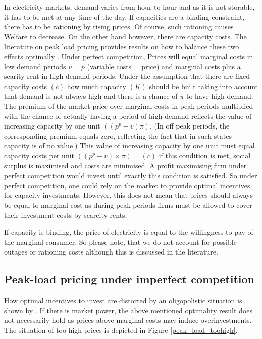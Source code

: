 In electricity markets, demand varies from hour to hour and as it is not storable, it has to be met at any time of the day. If capacities are a binding constraint, there has to be rationing by rising prices. Of course, such rationing causes Welfare to decrease. On the other hand however, there are capacity costs. The literature on peak load pricing provides results on how to balance these two effects optimally \cite{Crew1986}. Under perfect competition, Prices will equal marginal costs in low demand periods $v=p$ (variable costs = price) and marginal costs plus a scarity rent in high demand periods. Under the assumption that there are fixed capacity costs $(c)$ how much capacity $(K)$ should be built taking into account that demand is not always high and there is a chance of $\pi$ to have high demand. The premium of the market price over marginal costs in peak periods multiplied with the chance of actually having a period of high demand reflects the value of increasing capacity by one unit $((p^p-v)\pi)$. (In off peak periods, the corresponding premium equals zero, reflecting the fact that in such states capacity is of no value.) This value of increasing capacity by one unit must equal capacity costs per unit $((p^p-v)\times\pi)=(c)$ if this condition is met, social surplus is maximised and costs are minimised. A profit maximising firm under perfect competition would invest until exactly this condition is satisfied. So under perfect competition, one could rely on the market to provide optimal incentives for capacity investments. However, this does not mean that prices should always be equal to marginal cost as during peak periods firms must be allowed to cover their investment costs by scarcity rents.

If capacity is binding, the price of electricity is equal to the willingness to pay of the marginal consumer. So please note, that we do not account for possible outages or rationing costs although this is discussed in the literature.

\subsection{Peak-load pricing under imperfect competition}

How optimal incentives to invest are distorted by an oligopolistic situation is shown by \cite{Fehr1995}. If there is market power, the above mentioned optimality result does not necessarily hold as prices above marginal costs may induce overinvestments. The situation of too high prices is depicted in Figure \ref{peak_load_toohigh}.

